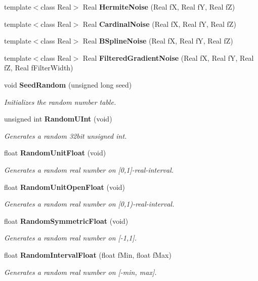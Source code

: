 \begin{CompactItemize}
template$<$class Real$>$ Real {\bf Hermite\-Noise} (Real f\-X, Real f\-Y, Real f\-Z)
\item 
template$<$class Real$>$ Real {\bf Cardinal\-Noise} (Real f\-X, Real f\-Y, Real f\-Z)
\item 
template$<$class Real$>$ Real {\bf BSpline\-Noise} (Real f\-X, Real f\-Y, Real f\-Z)
\item 
template$<$class Real$>$ Real {\bf Filtered\-Gradient\-Noise} (Real f\-X, Real f\-Y, Real f\-Z, Real f\-Filter\-Width)
\item 
void {\bf Seed\-Random} (unsigned long seed)
\begin{CompactList}\small\item\em Initializes the random number table. \item\end{CompactList}\item 
unsigned int {\bf Random\-UInt} (void)
\begin{CompactList}\small\item\em Generates a random 32bit unsigned int. \item\end{CompactList}\item 
float {\bf Random\-Unit\-Float} (void)
\begin{CompactList}\small\item\em Generates a random real number on [0,1]-real-interval. \item\end{CompactList}\item 
float {\bf Random\-Unit\-Open\-Float} (void)
\begin{CompactList}\small\item\em Generates a random real number on [0,1)-real-interval. \item\end{CompactList}\item 
float {\bf Random\-Symmetric\-Float} (void)
\begin{CompactList}\small\item\em Generates a random real number on [-1,1]. \item\end{CompactList}\item 
float {\bf Random\-Interval\-Float} (float f\-Min, float f\-Max)
\begin{CompactList}\small\item\em Generates a random real number on [-min, max]. \item\end{CompactList}\item 

\end{CompactItemize}
